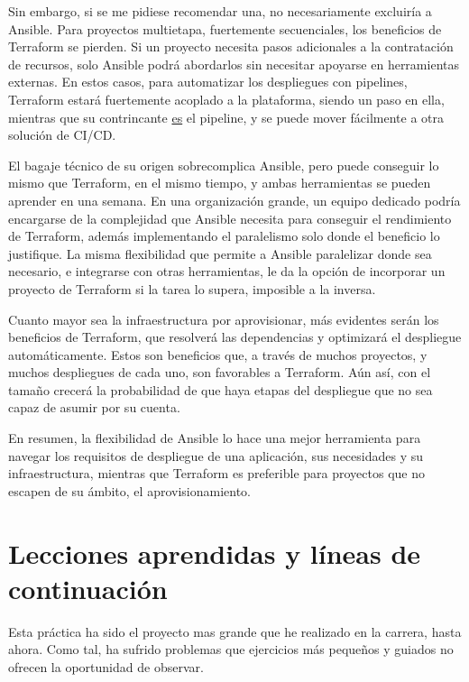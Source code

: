 \documentclass[11pt]{article}
\begin{document}
\begin{flushleft}
Sin embargo, si se me pidiese recomendar una, no necesariamente excluiría a Ansible. Para proyectos multietapa, fuertemente secuenciales, los beneficios de Terraform se pierden. Si un proyecto necesita pasos adicionales a la contratación de recursos, solo Ansible podrá abordarlos sin necesitar apoyarse en herramientas externas. En estos casos, para automatizar los despliegues con pipelines, Terraform estará fuertemente acoplado a la plataforma, siendo un paso en ella, mientras que su contrincante \underline{es} el pipeline, y se puede mover fácilmente a otra solución de CI/CD.
\linebreak

El bagaje técnico de su origen sobrecomplica Ansible, pero puede conseguir lo mismo que Terraform, en el mismo tiempo, y ambas herramientas se pueden aprender en una semana. En una organización grande, un equipo dedicado podría encargarse de la complejidad que Ansible necesita para conseguir el rendimiento de Terraform, además implementando el paralelismo solo donde el beneficio lo justifique. La misma flexibilidad que permite a Ansible paralelizar donde sea necesario, e integrarse con otras herramientas, le da la opción de incorporar un proyecto de Terraform si la tarea lo supera, imposible a la inversa.
\linebreak

Cuanto mayor sea la infraestructura por aprovisionar, más evidentes serán los beneficios de Terraform, que resolverá las dependencias y optimizará el despliegue automáticamente. Estos son beneficios que, a través de muchos proyectos, y muchos despliegues de cada uno, son favorables a Terraform. Aún así, con el tamaño crecerá la probabilidad de que haya etapas del despliegue que no sea capaz de asumir por su cuenta.
\linebreak

En resumen, la flexibilidad de Ansible lo hace una mejor herramienta para navegar los requisitos de despliegue de una aplicación, sus necesidades y su infraestructura, mientras que Terraform es preferible para proyectos que no escapen de su ámbito, el aprovisionamiento.
\linebreak




\clearpage
\section{Lecciones aprendidas y líneas de continuación}
Esta práctica ha sido el proyecto mas grande que he realizado en la carrera, hasta ahora. Como tal, ha sufrido problemas que ejercicios más pequeños y guiados no ofrecen la oportunidad de observar. 


\end{flushleft}
\end{document}
